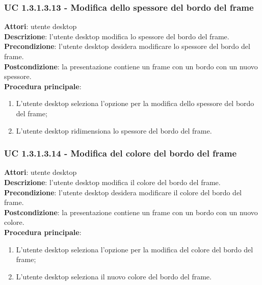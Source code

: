 \subsubsection{UC 1.3.1.3.13 - Modifica dello spessore del bordo del frame}{
	\label{uc1.3.1.3.13}
	\textbf{Attori}: utente desktop \\
	\textbf{Descrizione}: l'utente desktop modifica lo spessore del bordo del frame. \\
	\textbf{Precondizione}: l'utente desktop desidera modificare lo spessore del bordo del frame.	\\
	\textbf{Postcondizione}: la presentazione contiene un frame con un bordo con un nuovo spessore.	\\
	\textbf{Procedura principale}:
	\begin{enumerate}
		\item L'utente desktop seleziona l'opzione per la modifica dello spessore del bordo del frame;
		\item L'utente desktop ridimensiona lo spessore del bordo del frame.
	\end{enumerate}
	}
\subsubsection{UC 1.3.1.3.14 - Modifica del colore del bordo del frame}{
	\label{uc1.3.1.3.14}
	\textbf{Attori}: utente desktop \\
	\textbf{Descrizione}: l'utente desktop modifica il colore del bordo del frame. \\
	\textbf{Precondizione}: l'utente desktop desidera modificare il colore del bordo del frame.	\\
	\textbf{Postcondizione}: la presentazione contiene un frame con un bordo con un nuovo colore.	\\
	\textbf{Procedura principale}:
	\begin{enumerate}
		\item L'utente desktop seleziona l'opzione per la modifica del colore del bordo del frame;
		\item L'utente desktop seleziona il nuovo colore del bordo del frame.
	\end{enumerate}
	}
